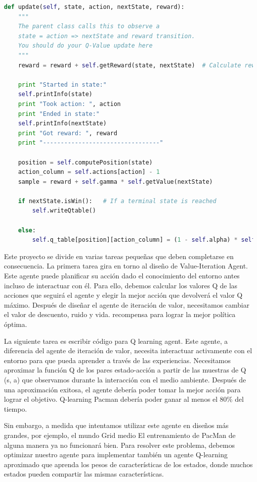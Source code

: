 \documentclass[11pt]{exam}
\begin{document}
\begin{lstlisting}[language=python, basicstyle=\footnotesize]
def update(self, state, action, nextState, reward):
	"""
	The parent class calls this to observe a
	state = action => nextState and reward transition.
	You should do your Q-Value update here
	"""
	reward = reward + self.getReward(state, nextState)  # Calculate reward
	
	print "Started in state:"
	self.printInfo(state)
	print "Took action: ", action
	print "Ended in state:"
	self.printInfo(nextState)
	print "Got reward: ", reward
	print "---------------------------------"	
	
	position = self.computePosition(state)
	action_column = self.actions[action] - 1
	sample = reward + self.gamma * self.getValue(nextState)
	
	if nextState.isWin():   # If a terminal state is reached
		self.writeQtable()
	
	else:
		self.q_table[position][action_column] = (1 - self.alpha) * self.q_table[position][action_column] + self.alpha * sample
\end{lstlisting}

Este proyecto se divide en varias tareas pequeñas que deben completarse en consecuencia. La primera tarea gira en torno al diseño de Value-Iteration Agent. Este agente puede planificar su acción dado el conocimiento del entorno antes incluso de interactuar con él. Para ello, debemos calcular los valores Q de las acciones que seguirá el agente y elegir la mejor acción que devolverá el valor Q máximo. Después de diseñar el agente de iteración de valor, necesitamos cambiar el valor de descuento, ruido y vida.
recompensa para lograr la mejor política óptima.

La siguiente tarea es escribir código para Q learning agent. Este agente, a diferencia del agente de iteración de valor, necesita interactuar activamente con el entorno para que pueda aprender a través de las experiencias. Necesitamos aproximar la función Q de los pares estado-acción a partir de las muestras de Q (s, a) que observamos durante la interacción con el medio ambiente. Después de una aproximación exitosa, el agente debería poder tomar la mejor acción para lograr el objetivo. Q-learning Pacman debería poder ganar al menos el 80\% del tiempo.

Sin embargo, a medida que intentamos utilizar este agente en diseños más grandes, por ejemplo, el mundo Grid medio
El entrenamiento de PacMan de alguna manera ya no funcionará bien. Para resolver este problema, debemos
optimizar nuestro agente para implementar también un agente Q-learning aproximado que aprenda los pesos de
características de los estados, donde muchos estados pueden compartir las mismas características.
\end{document}

